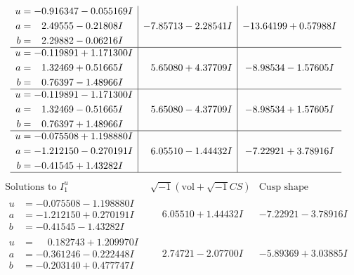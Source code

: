 \documentclass[1p]{elsarticle_modified}
\theoremstyle{definition}
\newcommand{\I}{\sqrt{-1}}
\begin{document}
$$\begin{array}{c|c|c}
\begin{aligned}
u &= -0.916347 - 0.055169 I \\
a &= \phantom{-}2.49555 - 0.21808 I \\
b &= \phantom{-}2.29882 - 0.06216 I\end{aligned}
 & -7.85713 - 2.28541 I & -13.64199 + 0.57988 I \\ \hline\begin{aligned}
u &= -0.119891 + 1.171300 I \\
a &= \phantom{-}1.32469 + 0.51665 I \\
b &= \phantom{-}0.76397 - 1.48966 I\end{aligned}
 & \phantom{-}5.65080 + 4.37709 I & -8.98534 - 1.57605 I \\ \hline\begin{aligned}
u &= -0.119891 - 1.171300 I \\
a &= \phantom{-}1.32469 - 0.51665 I \\
b &= \phantom{-}0.76397 + 1.48966 I\end{aligned}
 & \phantom{-}5.65080 - 4.37709 I & -8.98534 + 1.57605 I \\ \hline\begin{aligned}
u &= -0.075508 + 1.198880 I \\
a &= -1.212150 - 0.270191 I \\
b &= -0.41545 + 1.43282 I\end{aligned}
 & \phantom{-}6.05510 - 1.44432 I & -7.22921 + 3.78916 I\\
 \hline 
 \end{array}$$\newpage$$\begin{array}{c|c|c}  
\text{Solutions to }I^u_{1}& \I (\text{vol} + \sqrt{-1}CS) & \text{Cusp shape}\\
 \hline 
\begin{aligned}
u &= -0.075508 - 1.198880 I \\
a &= -1.212150 + 0.270191 I \\
b &= -0.41545 - 1.43282 I\end{aligned}
 & \phantom{-}6.05510 + 1.44432 I & -7.22921 - 3.78916 I \\ \hline\begin{aligned}
u &= \phantom{-}0.182743 + 1.209970 I \\
a &= -0.361246 - 0.222448 I \\
b &= -0.203140 + 0.477747 I\end{aligned}
 & \phantom{-}2.74721 - 2.07700 I & -5.89369 + 3.03885 I \\ \hline\begin{aligned}

\end{aligned}
\end{array}$$
\end{document}
